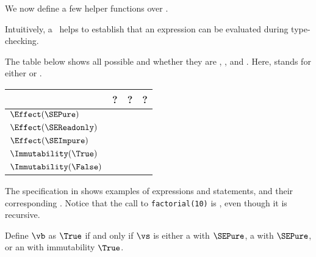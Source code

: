 We now define a few helper functions over \sideeffectdescriptorsterm.

Intuitively, a \emph{\pureterm} \sideeffectdescriptorterm\ helps to establish that
an expression can be evaluated during type-checking.

The table below shows all possible \sideeffectdescriptorsterm{} and whether they are \pureterm{}, \readonlyterm{}, and \symbolicallyevaluableterm{}.
Here, \Effect{} stands for either \LocalEffect{} or \GlobalEffect{}.

\begin{center}
\begin{tabular}{llll}
\textbf{\sideeffectdescriptorterm{}} & \textbf{\pureterm{}?} & \textbf{\readonlyterm{}?} & \textbf{\symbolicallyevaluableterm{}?}\\
\hline
$\Effect(\SEPure)$      & \True{}  & \True{}  & \True{}  \\
$\Effect(\SEReadonly)$  & \False{} & \True{}  & \True{}  \\
$\Effect(\SEImpure)$    & \False{} & \False{} & \False{} \\
$\Immutability(\True)$  & \True{}  & \True{}  & \True{}  \\
$\Immutability(\False)$ & \False{} & \True{}  & \False{} \\
\end{tabular}
\end{center}

The specification in  shows examples of expressions
and statements, and their corresponding \sideeffectdescriptorsterm{}.
Notice that the call to \verb|factorial(10)| is \readonlyterm, even though it is recursive.


\ProseParagraph
Define $\vb$ as $\True$ if and only if $\vs$ is either
    a \LocalEffectTerm{} with \purity{} $\SEPure$,
    a \GlobalEffectTerm{} with \purity{} $\SEPure$,
    or an \ImmutabilityTerm{} with immutability $\True$.

